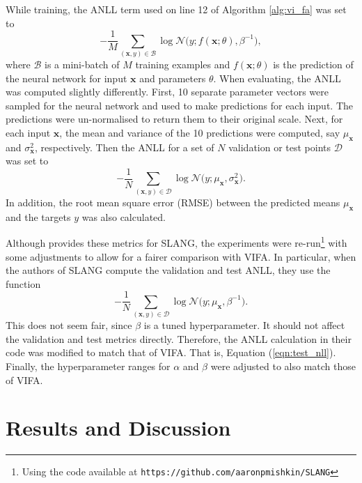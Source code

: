 \documentclass[msc,deptreport.inf]{infthesis} %
\newcommand{\matr}[1]{\mathbf{#1}}
\begin{document}
While training, the ANLL term used on line 12 of Algorithm \ref{alg:vi_fa} was set to
\begin{equation}\label{eqn:train_nll}
	-\frac{1}{M} \sum_{(\matr{x}, y) \in \mathcal{B}} \log \mathcal{N}\big(y; f(\matr{x}; \theta), \beta^{-1}\big),
\end{equation}
where $\mathcal{B}$ is a mini-batch of $M$ training examples and $f(\matr{x}; \theta)$ is the prediction of the neural network for input $\matr{x}$ and parameters $\theta$. When evaluating, the ANLL was computed slightly differently. First, 10 separate parameter vectors were sampled for the neural network and used to make predictions for each input. The predictions were un-normalised to return them to their original scale. Next, for each input $\matr{x}$, the mean and variance of the 10 predictions were computed, say $\mu_\matr{x}$ and $\sigma_\matr{x}^2$, respectively. Then the ANLL for a set of $N$ validation or test points $\mathcal{D}$ was set to
\begin{equation}\label{eqn:test_nll}
	-\frac{1}{N} \sum_{(\matr{x}, y) \in \mathcal{D}} \log \mathcal{N}\big(y; \mu_\matr{x},\sigma_\matr{x}^2\big).
\end{equation}
In addition, the root mean square error (RMSE) between the predicted means $\mu_\matr{x}$ and the targets $y$ was also calculated.

Although \cite{mishkin2018} provides these metrics for SLANG, the experiments were re-run\footnote{Using the code available at \texttt{https://github.com/aaronpmishkin/SLANG}} with some adjustments to allow for a fairer comparison with VIFA. In particular, when the authors of SLANG compute the validation and test ANLL, they use the function
\begin{equation}\label{eqn:slang_nll}
	-\frac{1}{N} \sum_{(\matr{x}, y) \in \mathcal{D}} \log \mathcal{N}\big(y; \mu_\matr{x},\beta^{-1}\big).
\end{equation}
This does not seem fair, since $\beta$ is a tuned hyperparameter. It should not affect the validation and test metrics directly. Therefore, the ANLL calculation in their code was modified to match that of VIFA. That is, Equation (\ref{eqn:test_nll}). Finally, the hyperparameter ranges for $\alpha$ and $\beta$ were adjusted to also match those of VIFA. 


\section{Results and Discussion} 
\end{document}
